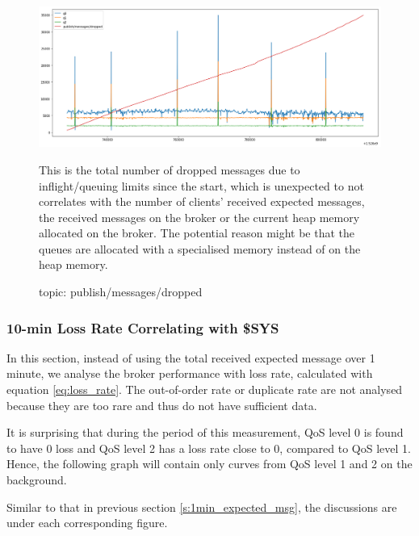 \documentclass[12pt, letterpaper]{article}
\begin{document}
\begin{figure}
	\setlength{\tabcolsep}{0pt}
	\caption{topic: publish/messages/dropped}
	\label{f:valid_cnt_publish_messages_dropped}
	\begin{center}
		\includegraphics[width=\textwidth]{valid_cnt/valid_cnt-publish_messages_dropped}	
	\end{center}
	This is the total number of dropped messages due to inflight/queuing limits since the start, which is unexpected to not correlates with the number of clients' received expected messages, the received messages on the broker or the current heap memory allocated on the broker. The potential reason might be that the queues are allocated with a specialised memory instead of on the heap memory.
\end{figure}

\FloatBarrier
\subsubsection{10-min Loss Rate Correlating with \$SYS}
In this section, instead of using the total received expected message over 1 minute, we analyse the broker performance with loss rate, calculated with equation \ref{eq:loss_rate}. The out-of-order rate or duplicate rate are not analysed because they are too rare and thus do not have sufficient data.

It is surprising that during the period of this measurement, QoS level 0 is found to have 0 loss and QoS level 2 has a loss rate close to 0, compared to QoS level 1. Hence, the following graph will contain only curves from QoS level 1 and 2 on the background.

Similar to that in previous section \ref{s:1min_expected_msg}, the discussions are under each corresponding figure.
\end{document}
